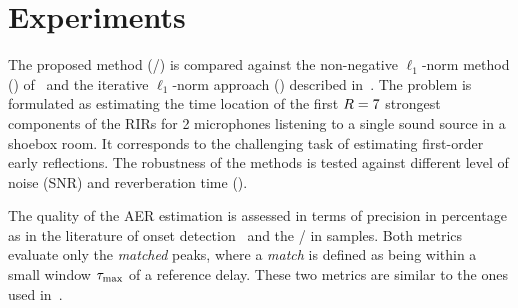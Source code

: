 \section{Experiments}\label{sec:blaster:exp}
The proposed method (\BLASTER/) is compared against the non-negative $\ell_1$-norm method (\algoBsn) of~ and the iterative $\ell_1$-norm approach (\algoCrocco) described in~.
The problem is formulated as estimating the time location of the first $R=7$ strongest components of the RIRs for 2 microphones listening to a single sound source in a shoebox room. It corresponds to the challenging task of estimating first-order early reflections.
The robustness of the methods is tested against different level of noise (SNR) and reverberation time (\RT{}).

\mynewline
The quality of the AER estimation is assessed in terms of precision
in percentage as in the literature of onset detection~ and the \RMSEtxt/ in samples.
Both metrics evaluate only the \textit{matched} peaks, where a \textit{match} is defined as being within a small window $\tau_\text{max}$ of a reference delay.
These two metrics are similar to the ones used in~.

